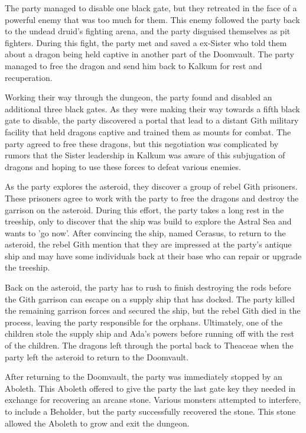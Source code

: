 The party managed to disable one black gate, but they retreated in the face of a powerful enemy that was too much for them.
This enemy followed the party back to the undead druid's fighting arena, and the party disguised themselves as pit fighters.
During this fight, the party met and saved a ex-Sister who told them about a dragon being held captive in another part of the Doomvault.
The party managed to free the dragon and send him back to Kalkum for rest and recuperation.

Working their way through the dungeon, the party found and disabled an additional three black gates.
As they were making their way towards a fifth black gate to disable, the party discovered a portal that lead to a distant Gith military facility that held dragons captive and trained them as mounts for combat.
The party agreed to free these dragons, but this negotiation was complicated by rumors that the Sister leadership in Kalkum was aware of this subjugation of dragons and hoping to use these forces to defeat various enemies.

As the party explores the asteroid, they discover a group of rebel Gith prisoners.
These prisoners agree to work with the party to free the dragons and destroy the garrison on the asteroid.
During this effort, the party takes a long rest in the treeship, only to discover that the ship was build to explore the Astral Sea and wants to 'go now'.
After convincing the ship, named Cerasus, to return to the asteroid, the rebel Gith mention that they are impressed at the party's antique ship and may have some individuals back at their base who can repair or upgrade the treeship.

Back on the asteroid, the party has to rush to finish destroying the rods before the Gith garrison can escape on a supply ship that has docked.
The party killed the remaining garrison forces and secured the ship, but the rebel Gith died in the process, leaving the party responsible for the orphans.
Ultimately, one of the children stole the supply ship and Ada's powers before running off with the rest of the children.
The dragons left through the portal back to Theaceae when the party left the asteroid to return to the Doomvault.

After returning to the Doomvault, the party was immediately stopped by an Aboleth.
This Aboleth offered to give the party the last gate key they needed in exchange for recovering an arcane stone.
Various monsters attempted to interfere, to include a Beholder, but the party successfully recovered the stone.
This stone allowed the Aboleth to grow and exit the dungeon.

